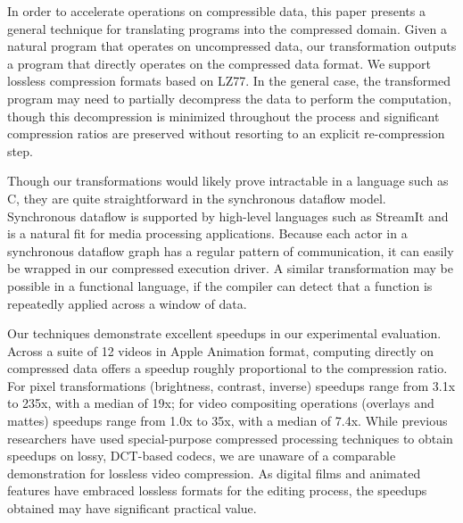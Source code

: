 In order to accelerate operations on compressible data, this paper
presents a general technique for translating programs into the
compressed domain.  Given a natural program that operates on
uncompressed data, our transformation outputs a program that directly
operates on the compressed data format.  We support lossless
compression formats based on LZ77.  In the general case, the
transformed program may need to partially decompress the data to
perform the computation, though this decompression is minimized
throughout the process and significant compression ratios are
preserved without resorting to an explicit re-compression step.

Though our transformations would likely prove intractable in a
language such as C, they are quite straightforward in the synchronous
dataflow model.  Synchronous dataflow is supported by high-level
languages such as StreamIt and is a natural fit for media processing
applications.  Because each actor in a synchronous dataflow graph has
a regular pattern of communication, it can easily be wrapped in our
compressed execution driver.  A similar transformation may be possible
in a functional language, if the compiler can detect that a function
is repeatedly applied across a window of data.

Our techniques demonstrate excellent speedups in our experimental
evaluation.  Across a suite of 12 videos in Apple Animation format,
computing directly on compressed data offers a speedup roughly
proportional to the compression ratio.  For pixel transformations
(brightness, contrast, inverse) speedups range from 3.1x to 235x, with
a median of 19x; for video compositing operations (overlays and
mattes) speedups range from 1.0x to 35x, with a median of 7.4x.  While
previous researchers have used special-purpose compressed processing
techniques to obtain speedups on lossy, DCT-based codecs, we are
unaware of a comparable demonstration for lossless video compression.
As digital films and animated features have embraced lossless formats
for the editing process, the speedups obtained may have significant
practical value.
